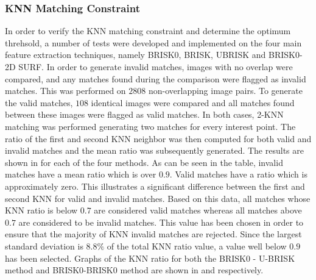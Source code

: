 \documentclass{article}
\begin{document}
\subsubsection{KNN Matching Constraint}
\label{sec:knnMatchingConstraint}
In order to verify the KNN matching constraint and determine the optimum threhsold, a number of tests were developed and implemented on the four main feature extraction techniques, namely BRISK0, BRISK, UBRISK and BRISK0-2D SURF. In order to generate invalid matches, images with no overlap were compared, and any matches found during the comparison were flagged as invalid matches. This was performed on $2808$ non-overlapping image pairs. To generate the valid matches, $108$ identical images were compared and all matches found between these images were flagged as valid matches. In both cases, 2-KNN matching was performed generating two matches for every interest point. The ratio of the first and second KNN neighbor was then computed for both valid and invalid matches and the mean ratio was subsequently generated. The results are shown in  for each of the four methods. As can be seen in the table, invalid matches have a mean ratio which is over $0.9$. Valid matches have a ratio which is approximately zero. This illustrates a significant difference between the first and second KNN for valid and invalid matches. Based on this data, all matches whose KNN ratio is below $0.7$ are considered valid matches whereas all matches above $0.7$ are considered to be invalid matches. This value has been chosen in order to ensure that the majority of KNN invalid matches are rejected. Since the largest standard deviation is $8.8\%$ of the total KNN ratio value, a value well below $0.9$ has been selected. Graphs of the KNN ratio for both the BRISK0 - U-BRISK method and BRISK0-BRISK0 method are shown in  and  respectively. \\
\end{document}
